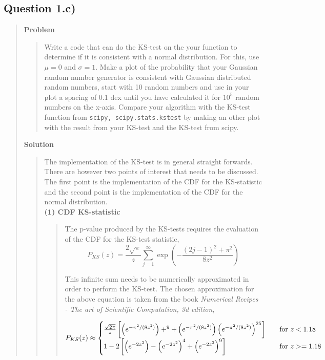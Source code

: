 
\subsection*{\textbf{Question 1.c)}}
\begin{quote}

\textbf{Problem}
\begin{quote}
Write a code that can do the KS-test on the your function to determine if it is consistent with a normal distribution. For this, use $\mu = 0$ and $\sigma = 1$. Make a plot of the probability that your Gaussian random number generator is consistent with Gaussian distributed random numbers, start with 10 random numbers and use in your plot a spacing of 0.1 dex until you have calculated it for $10^5$ random numbers on the x-axis. Compare your algorithm with the KS-test function from \texttt{scipy, scipy.stats.kstest} by making an other plot with the result from your KS-test and the KS-test from scipy.
\end{quote}

\textbf{Solution} 
\begin{quote}
The implementation of the KS-test is in general straight forwards. There are however two points of interest that needs to be discussed. The first point is the implementation of the CDF for the KS-statistic and the second point is the implementation of the CDF for the normal distribution.
\\

\textbf{(1) CDF KS-statistic }
\begin{quote}
The p-value produced by the KS-tests requires the evaluation of the CDF for the KS-test statistic,
\begin{equation}
P_{KS}(z) = \frac{2\sqrt{\pi}}{z} \sum_{j=1}^{\infty} \exp\left(- \frac{(2j-1)^2+\pi^2}{8z^2} \right)
\end{equation}

This infinite sum needs to be numerically approximated in order to perform the KS-test. The chosen approximation for the above equation is taken from the book \textit{Numerical Recipes - The art of Scientific Computation, 3d edition}, 

\begin{equation}
P_{KS}(z) \approx
\begin{cases}
\frac{\sqrt{2 \pi}}{z} \left[ \left( e^{-\pi^2/(8z^2)} \right)+^{9} + \left( e^{-\pi^2/(8z^2)} \right) \left( e^{-\pi^2/(8z^2)} \right)^{25} \right] &\quad \text{for $ z < 1.18$}\\
1 -2 \left[ \left(e^{-2z^2}\right) - \left(e^{-2z^2}\right)^4 + \left(e^{-2z^2}\right)^9 \right]  &\quad \text{for $ z >= 1.18$}
\end{cases}
\end{equation}
\end{quote}


\end{quote}
\end{quote}
